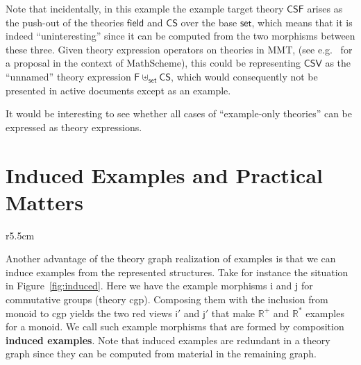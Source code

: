 \documentclass[11pt]{bluenote}
\def\cn#1{\mathsf{#1}}
\def\mmt{MMT\xspace}
\def\defemph{\textbf}
\begin{document}
Note that incidentally, in this example the example target theory $\cn{CSF}$ arises as the
push-out of the theories $\cn{field}$ and $\cn{CS}$ over the base $\cn{set}$, which means
that it is indeed ``uninteresting'' since it can be computed from the two morphisms
between these three.  Given theory expression operators on theories in \mmt, (see
e.g.~\cite{CarCon:tpc12} for a proposal in the context of MathScheme), this could be
representing $\cn{CSV}$ as the ``unnamed'' theory expression
$\cn{F}\uplus_{\cn{set}}\cn{CS}$, which would consequently not be presented in active
documents except as an example.

It would be interesting to see whether all cases of ``example-only theories'' can be
expressed as theory expressions.


\section{Induced Examples and Practical Matters}

\begin{wrapfigure}r{5.5cm}\vspace*{-1.5em}
  \caption{Induced Examples}\label{fig:induced}\vspace*{-1em}
\end{wrapfigure}
Another advantage of the theory graph realization of examples is that we can induce
examples from the represented structures. Take for instance the situation in
Figure~\ref{fig:induced}. Here we have the example morphisms \textsf{i} and \textsf{j} for
commutative groups (theory \textsf{cgp}). Composing them with the inclusion from
\textsf{monoid} to \textsf{cgp} yields the two red views $\mathsf{i}'$ and $\mathsf{j}'$
that make $\mathbb{R}^+$ and $\mathbb{R}^*$ examples for a monoid. We call such example
morphisms that are formed by composition \defemph{induced examples}. Note that induced
examples are redundant in a theory graph since they can be computed from material in the
remaining graph.
\end{document}
